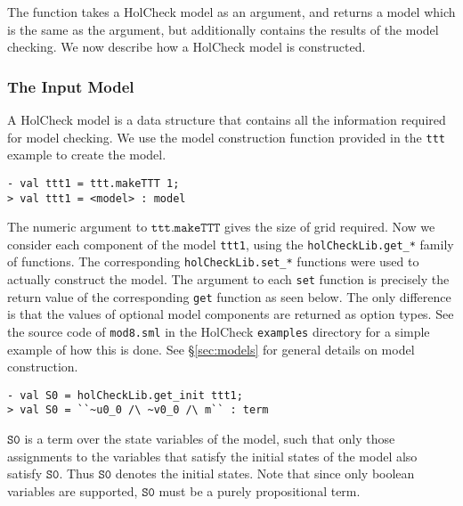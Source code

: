\documentclass[12pt,fleqn]{article}
\newcommand{\hc}{HolCheck}
\begin{document}
The function takes a \hc{} model as an argument, and returns a model which is the same as the argument, but additionally contains the results of the model checking. We now describe how a \hc{} model is constructed.

\subsubsection{The Input Model}

A \hc{} model is a data structure that contains all the information required for model checking. We use the model construction function provided in the \texttt{ttt} example to create the model.

\begin{session}\begin{verbatim}
- val ttt1 = ttt.makeTTT 1;
> val ttt1 = <model> : model
\end{verbatim}\end{session}

The numeric argument to \(\mathtt{ttt.makeTTT}\) gives the size of grid required.  Now we consider each component of the model \texttt{ttt1}, using the \texttt{holCheckLib.get\_*} family of functions. The corresponding \texttt{holCheckLib.set\_*} functions were used to actually construct the model. The argument to each \texttt{set} function is precisely the return value of the corresponding \texttt{get} function as seen below. The only difference is that the values of optional model components are returned as option types. See the source code of \texttt{mod8.sml} in the HolCheck \texttt{examples} directory for a simple example of how this is done. See \S\ref{sec:models} for general details on model construction.

\begin{session}\begin{verbatim}
- val S0 = holCheckLib.get_init ttt1;
> val S0 = ``~u0_0 /\ ~v0_0 /\ m`` : term
\end{verbatim}\end{session}
\(\mathtt{S0}\) is a term over the state variables of the model, such that only those assignments to the variables that satisfy the initial states of the model also satisfy \(\mathtt{S0}\). Thus \(\mathtt{S0}\) denotes the initial states. Note that since only boolean variables are supported, \(\mathtt{S0}\) must be a purely propositional term.
\end{document}
